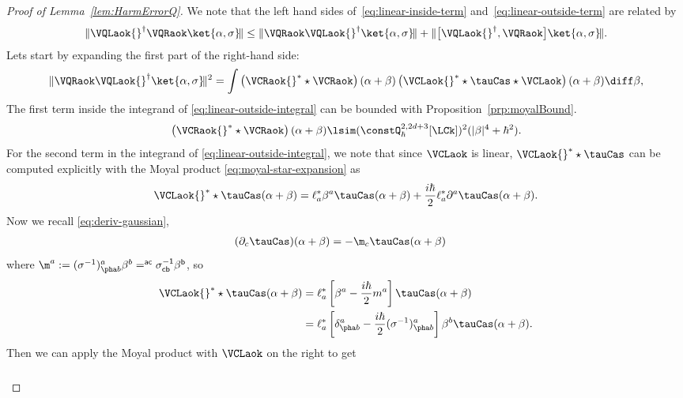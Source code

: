 \documentclass{article}
\numberwithin{equation}{section}
\begin{document}
\begin{proof}[Proof of Lemma~\ref{lem:HarmErrorQ}]
	We note that the left hand sides of~\eqref{eq:linear-inside-term}
	and~\eqref{eq:linear-outside-term} are related by
	\begin{align}\label{eq:linear-inside-outside-term-relation}
		\|\VQLaok{}^\dagger \VQRaok \ket{\alpha,\sigma}\!\|
		\leq
		\|\VQRaok \VQLaok{}^\dagger \ket{\alpha,\sigma}\!\|
		+
		\|\big[\VQLaok{}^\dagger,  \VQRaok\big] \ket{\alpha,\sigma}\!\|.
	\end{align}
	Lets start by expanding the first part of the right-hand side:
	\begin{equation}\label{eq:linear-outside-integral}
		\|\VQRaok \VQLaok{}^\dagger \ket{\alpha,\sigma}\!\|^2
		=
		\int
		\left( \VCRaok{}^* \star \VCRaok\right) (\alpha+\beta)
		\left( \VCLaok{}^* \star \tauCas \star \VCLaok\right)(\alpha+\beta) \diff \beta,
	\end{equation}
	The first term inside the integrand of \eqref{eq:linear-outside-integral} can be bounded with Proposition~\ref{prp:moyalBound}.
	\begin{equation}\label{eq:linear-outside-integral-part-1}
		\left( \VCRaok{}^* \star \VCRaok\right) (\alpha+\beta)
		\lsim
		(\constQ^{2,2d+3}_{\hbar}[\LCk])^2 (|\beta|^4 + \hbar^2).
	\end{equation}
	For the second term in the integrand of \eqref{eq:linear-outside-integral}, we note that since
	$\VCLaok$ is linear,  $ \VCLaok{}^* \star \tauCas$ can be computed explicitly with the Moyal product \eqref{eq:moyal-star-expansion} as
	\begin{equation}
		\VCLaok{}^*\star \tauCas (\alpha+\beta) =
		\ell_a^* \beta^a \tauCas(\alpha+\beta) + \frac{i\hbar}{2} \ell_a^* \partial^a \tauCas(\alpha+\beta).
	\end{equation}
	Now we recall \eqref{eq:deriv-gaussian},
	\begin{align}
		(\partial_c \tauCas)(\alpha+\beta) &=  -\m_c \tauCas(\alpha+\beta)
	\end{align}
	where $\m^a:= (\sigma^{-1})^a_{\pha b} \beta^b = \sf^{ac}\sigma^{-1}_{cb} \beta^b$, so
	\begin{align}
		\VCLaok{}^*\star \tauCas(\alpha+\beta)
		&= \ell_a^* \left[\beta^a - \frac{i\hbar}{2} m^a\right] \tauCas(\alpha+\beta)\\
		&= \ell_a^* \left[\delta^a_{\pha b} - \frac{i\hbar}{2} (\sigma^{-1})^a_{\pha b}\right]\beta^b \tauCas(\alpha+\beta).
	\end{align}
	Then we can apply the Moyal product with $\VCLaok$ on the right to get
	\begin{align}\label{eq:v-tau-v}\begin{split}

\end{split}
\end{align}
\end{proof}
\end{document}
